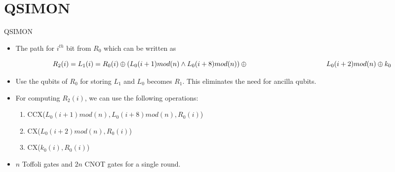 \section{QSIMON}

\begin{frame}{QSIMON}
\begin{itemize}
    \item The path for $i^{th}$ bit from $R_0$ which can be written as
    \pause
\begin{center}
    \begin{equation*}
    R_2(i) = L_1(i) = R_0(i) \oplus (L_0(i+1)mod(n) \wedge L_0(i+8)mod(n)) \oplus \\
    \hspace{4cm}L_0(i+2)mod(n) \oplus k_0
\end{equation*}
\end{center}
\pause
\item Use the qubits of $R_0$ for storing $L_1$ and $L_0$ becomes $R_1$. This eliminates the need for ancilla qubits.
\pause
\item For computing $R_2(i)$, we can use the following operations:
\begin{enumerate}
    \item CCX($L_0(i+1)mod(n), L_0(i+8)mod(n), R_0(i)$)
    \item CX($L_0(i+2)mod(n), R_0(i)$)
    \item CX($k_0(i), R_0(i)$)
\end{enumerate}
\pause
\item $n$ Toffoli gates and $2n$ CNOT gates for a single round.
\end{itemize}
\end{frame}
